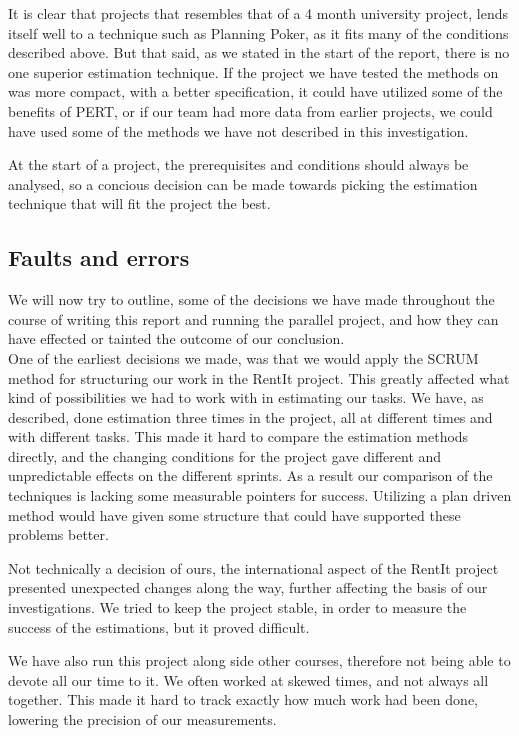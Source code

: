It is clear that projects that resembles that of a 4 month university project, lends itself well to a technique such as Planning Poker, as it fits many of the conditions described above. But that said, as we stated in the start of the report, there is no one superior estimation technique. If the project we have tested the methods on was more compact, with a better specification, it could have utilized some of the benefits of PERT, or if our team had more data from earlier projects, we could have used some of the methods we have not described in this investigation. 

At the start of a project, the prerequisites and conditions should always be analysed, so a concious decision can be made towards picking the estimation technique that will fit the project the best.

\subsection{Faults and errors}
We will now try to outline, some of the decisions we have made throughout the course of writing this report and running the parallel project, and how they can have effected or tainted the outcome of our conclusion.\\

One of the earliest decisions we made, was that we would apply the SCRUM method for structuring our work in the RentIt project. This greatly affected what kind of possibilities we had to work with in estimating our tasks. We have, as described, done estimation three times in the project, all at different times and with different tasks. This made it hard to compare the estimation methods directly, and the changing conditions for the project gave different and unpredictable effects on the different sprints. As a result our comparison of the techniques is lacking some measurable pointers for success. Utilizing a plan driven method would have given some structure that could have supported these problems better.

Not technically a decision of ours, the international aspect of the RentIt project presented unexpected changes along the way, further affecting the basis of our investigations. We tried to keep the project stable, in order to measure the success of the estimations, but it proved difficult.

We have also run this project along side other courses, therefore not being able to devote all our time to it. We often worked at skewed times, and not always all together. This made it hard to track exactly how much work had been done, lowering the precision of our measurements.


